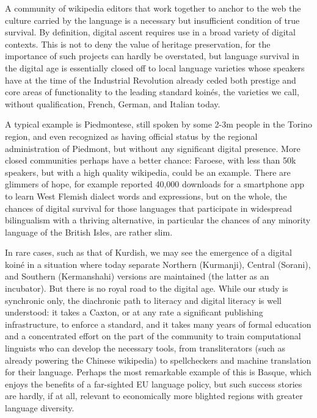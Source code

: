 \documentclass[10pt]{article}
\begin{document}
A community of wikipedia editors that work together to anchor to the web the
culture carried by the language is a necessary but insufficient condition of
true survival. By definition, digital ascent requires use in a broad
variety of digital contexts. This is not to deny the value of heritage
preservation, for the importance of such projects can hardly be overstated,
but language survival in the digital age is essentially closed off to local
language varieties whose speakers have at the time of the Industrial
Revolution already ceded both prestige and core areas of functionality to the
leading standard koin\'es, the varieties we call, without qualification,
French, German, and Italian today. 

A typical example is Piedmontese, still spoken by some 2-3m people in the
Torino region, and even recognized as having official status by the regional
administration of Piedmont, but without any significant digital presence.
More closed communities perhaps have a better chance: Faroese, with less than
50k speakers, but with a high quality wikipedia, could be an example.  There
are glimmers of hope, for example \cite{flanderstoday:12-06-12} reported
40,000 downloads for a smartphone app to learn West Flemish dialect words and
expressions, but on the whole, the chances of digital survival for those
languages that participate in widespread bilingualism with a thriving
alternative, in particular the chances of any minority language of the British
Isles, are rather slim. 

In rare cases, such as that of Kurdish, we may see the emergence of a digital
koin\'e in a situation where today separate Northern (Kurmanji), Central
(Sorani), and Southern (Kermanshahi) versions are maintained (the latter as an
incubator). But there is no royal road to the digital age. {\color{black} While
  our study is synchronic only, the diachronic path to literacy and digital
  literacy is well understood: it takes a Caxton, or at any rate a significant publishing
  infrastructure, to enforce a standard, and it takes many years of formal
  education and}
a concentrated effort on the part of the community to train computational
linguists who can develop the necessary tools, from transliterators (such as
already powering the Chinese wikipedia) to spellcheckers and machine
translation for their language. Perhaps the most remarkable example of this is
Basque, which enjoys the benefits of a far-sighted EU language policy, but
such success stories are hardly, if at all, relevant to economically more
blighted regions with greater language diversity. 
\end{document}
